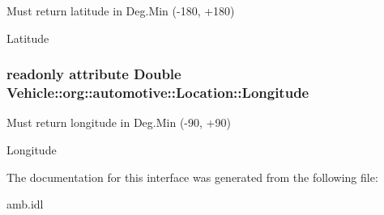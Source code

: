 Must return latitude in Deg.\-Min (-\/180, +180) 

Latitude \hypertarget{interfaceVehicle_1_1org_1_1automotive_1_1Location_a04b8c8295470ba6d014d352b816ec639}{
\subsubsection[{Longitude}]{\setlength{\rightskip}{0pt plus 5cm}readonly attribute Double Vehicle\-::org\-::automotive\-::\-Location\-::\-Longitude}}\label{interfaceVehicle_1_1org_1_1automotive_1_1Location_a04b8c8295470ba6d014d352b816ec639}


Must return longitude in Deg.\-Min (-\/90, +90) 

Longitude 

The documentation for this interface was generated from the following file\-:\begin{DoxyCompactItemize}
\item 
amb.\-idl\end{DoxyCompactItemize}
